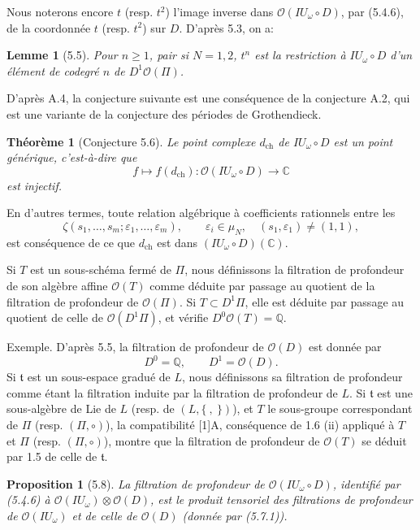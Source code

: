 \documentclass[10pt,a4paper]{article}
\newcommand{\Q}{\mathbb Q}
\newcommand{\OO}{\mathcal O}
\newcommand{\C}{\mathbb C}
\theoremstyle{deligne}
\newtheorem*{theorem*}{Théorème}
\newtheorem*{proposition*}{Proposition}
\newtheorem*{lemma*}{Lemme}
\newcommand{\heading}[1]{\vspace{0.65em}\noindent{\bfseries #1}\quad}
\begin{document}
Nous noterons encore \(t\) (resp. \(t^2\)) l'image inverse dans \(\OO(IU_\omega\circ D)\), par (5.4.6), de la coordonnée \(t\) (resp. \(t^2\)) sur \(D\). D'après 5.3, on a:

\begin{lemma*}[5.5]
Pour \(n\ge1\), pair si \(N=1,2\), \(t^n\) est la restriction à \(IU_\omega\circ D\) d'un élément de codegré \(n\) de \(D^1\OO(\Pi)\).
\end{lemma*}

D'après A.4, la conjecture suivante est une conséquence de la conjecture A.2, qui est une variante de la conjecture des périodes de Grothendieck.

\begin{theorem*}[Conjecture 5.6]
Le point complexe \(d_{\mathrm{ch}}\) de \(IU_\omega\circ D\) est un point générique, c'est-à-dire que
\[
\tag{5.6.1}
f\longmapsto f(d_{\mathrm{ch}}):\OO(IU_\omega\circ D)\longrightarrow\C
\]
est injectif.
\end{theorem*}

En d'autres termes, toute relation algébrique à coefficients rationnels entre les
\[
\zeta(s_1,\ldots,s_m;\varepsilon_1,\ldots,\varepsilon_m),\qquad
\varepsilon_i\in\mu_N,\quad (s_1,\varepsilon_1)\ne(1,1),
\]
est conséquence de ce que \(d_{\mathrm{ch}}\) est dans \((IU_\omega\circ D)(\C)\).

\heading{5.7.} Si \(T\) est un sous-schéma fermé de \(\Pi\), nous définissons la filtration de profondeur de son algèbre affine \(\OO(T)\) comme déduite par passage au quotient de la filtration de profondeur de \(\OO(\Pi)\). Si \(T\subset D^1\Pi\), elle est déduite par passage au quotient de celle de \(\OO(D^1\Pi)\), et vérifie \(D^0\OO(T)=\Q\).

Exemple. D'après 5.5, la filtration de profondeur de \(\OO(D)\) est donnée par
\[
\tag{5.7.1}
D^0=\Q,\qquad D^1=\OO(D).
\]
Si \(\mathfrak t\) est un sous-espace gradué de \(L\), nous définissons sa filtration de profondeur comme étant la filtration induite par la filtration de profondeur de \(L\). Si \(\mathfrak t\) est une sous-algèbre de Lie de \(L\) (resp. de \((L,\{\ ,\ \})\)), et \(T\) le sous-groupe correspondant de \(\Pi\) (resp. \((\Pi,\circ)\)), la compatibilité [1]A, conséquence de 1.6 (ii) appliqué à \(T\) et \(\Pi\) (resp. \((\Pi,\circ)\)), montre que la filtration de profondeur de \(\OO(T)\) se déduit par 1.5 de celle de \(\mathfrak t\).

\begin{proposition*}[5.8]
La filtration de profondeur de \(\OO(IU_\omega\circ D)\), identifié par (5.4.6) à \(\OO(IU_\omega)\otimes\OO(D)\), est le produit tensoriel des filtrations de profondeur de \(\OO(IU_\omega)\) et de celle de \(\OO(D)\) (donnée par (5.7.1)).
\end{proposition*}
\end{document}
